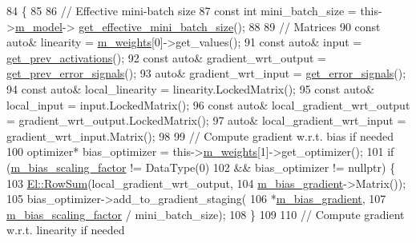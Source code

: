 \begin{DoxyCode}
84                                                                       \{
85 
86   \textcolor{comment}{// Effective mini-batch size}
87   \textcolor{keyword}{const} \textcolor{keywordtype}{int} mini\_batch\_size = this->\hyperlink{classlbann_1_1Layer_a3d9315e99574166f2f33e37b572021d2}{m\_model}->
      \hyperlink{classlbann_1_1model_a2a9b4cfa1c8c91e4131908751f9c4a6a}{get\_effective\_mini\_batch\_size}();
88 
89   \textcolor{comment}{// Matrices}
90   \textcolor{keyword}{const} \textcolor{keyword}{auto}& linearity = \hyperlink{classlbann_1_1Layer_a7954e30fbf9100a6ba4b56d02767a469}{m\_weights}[0]->get\_values();
91   \textcolor{keyword}{const} \textcolor{keyword}{auto}& input = \hyperlink{classlbann_1_1Layer_a45853df73a2e72bfaa774665a0f37ed7}{get\_prev\_activations}();
92   \textcolor{keyword}{const} \textcolor{keyword}{auto}& gradient\_wrt\_output = \hyperlink{classlbann_1_1Layer_a7ac4579d3c1671dfaf86e3b618d6938a}{get\_prev\_error\_signals}();
93   \textcolor{keyword}{auto}& gradient\_wrt\_input = \hyperlink{classlbann_1_1Layer_adb561e140e0bb601f3c5a8ee053a71d2}{get\_error\_signals}();
94   \textcolor{keyword}{const} \textcolor{keyword}{auto}& local\_linearity = linearity.LockedMatrix();
95   \textcolor{keyword}{const} \textcolor{keyword}{auto}& local\_input = input.LockedMatrix();
96   \textcolor{keyword}{const} \textcolor{keyword}{auto}& local\_gradient\_wrt\_output = gradient\_wrt\_output.LockedMatrix();
97   \textcolor{keyword}{auto}& local\_gradient\_wrt\_input = gradient\_wrt\_input.Matrix();
98 
99   \textcolor{comment}{// Compute gradient w.r.t. bias if needed}
100   optimizer* bias\_optimizer = this->\hyperlink{classlbann_1_1Layer_a7954e30fbf9100a6ba4b56d02767a469}{m\_weights}[1]->get\_optimizer();
101   \textcolor{keywordflow}{if} (\hyperlink{classlbann_1_1fully__connected__layer_ae02eaffd5528bf572883f8b06d1b40c0}{m\_bias\_scaling\_factor} != DataType(0)
102       && bias\_optimizer != \textcolor{keyword}{nullptr}) \{
103     \hyperlink{namespaceEl_a584f088a3325a8222d4d6ac37be04b04}{El::RowSum}(local\_gradient\_wrt\_output,
104                \hyperlink{classlbann_1_1fully__connected__layer_a6510917c573378f40789a1d16db22b4e}{m\_bias\_gradient}->Matrix());
105     bias\_optimizer->add\_to\_gradient\_staging(
106       *\hyperlink{classlbann_1_1fully__connected__layer_a6510917c573378f40789a1d16db22b4e}{m\_bias\_gradient},
107       \hyperlink{classlbann_1_1fully__connected__layer_ae02eaffd5528bf572883f8b06d1b40c0}{m\_bias\_scaling\_factor} / mini\_batch\_size);
108   \}
109 
110   \textcolor{comment}{// Compute gradient w.r.t. linearity if needed}

\end{DoxyCode}
